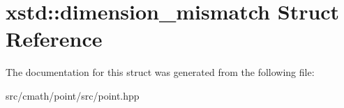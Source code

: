 \hypertarget{structxstd_1_1dimension__mismatch}{\section{xstd\-:\-:dimension\-\_\-mismatch Struct Reference}
\label{structxstd_1_1dimension__mismatch}
}


The documentation for this struct was generated from the following file\-:\begin{DoxyCompactItemize}
\item 
src/cmath/point/src/point.\-hpp\end{DoxyCompactItemize}
